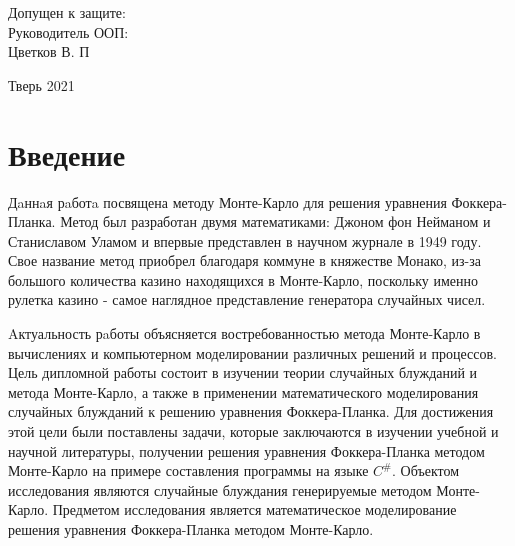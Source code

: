 \documentclass[a4paper]{report}
\begin{document}
\begin{titlepage}
\begin{flushright}
\begin{minipage}{65mm}
          \end{minipage}
     \end{flushright}


     \vspace{1.6cm}
     \noindent Допущен к защите:\\
     Руководитель ООП:\\[0.2cm]
     \underline{\qquad \qquad \qquad \qquad \qquad } Цветков В. П\\
     \vspace{2.0cm}



     \begin{center}
          Тверь 2021
     \end{center}

     \date{}
\end{titlepage}

\setcounter{page}{2}

\tableofcontents
\newpage



\section*{Введение}

Дaннaя рaботa посвящена методу Монте-Карло для решения уравнения Фоккера-Планка.
Метод был разработан двумя математиками: Джоном фон Нейманом и Станиславом Уламом и впервые представлен в научном журнале в 1949 году. Свое название метод приобрел благодаря коммуне в княжестве Монако, из-за большого количества казино находящихся в Монте-Карло, поскольку именно рулетка казино - самое наглядное представление генератора случайных чисел.

Aктуальность рaботы объясняется востребованностью метода Монте-Карло в вычислениях и компьютерном моделировании различных решений и процессов. Цель дипломной работы состоит в изучении теории случайных блужданий и метода Монте-Карло, а также в применении математического моделирования случайных блужданий к решению уравнения Фоккера-Планка. Для достижения этой цели были поставлены задачи, которые заключаются в изучении учебной и научной литературы, получении решения уравнения Фоккера-Планка методом Монте-Карло на примере составления программы на языке $C^\#$.
Объектом исследования являются случайные блуждания генерируемые методом Монте-Карло. Предметом исследования является математическое моделирование решения уравнения Фоккера-Планка методом Монте-Карло.
\end{document}
